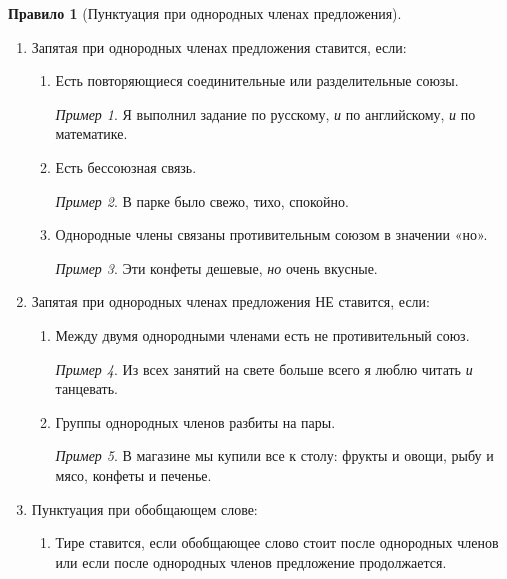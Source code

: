 \documentclass[12pt]{article}
\theoremstyle{definition}
\newtheorem{rrule}{Правило}[section]
\theoremstyle{remark}
\newtheorem*{example}{Пример}
\begin{document}
\begin{rrule}[Пунктуация при однородных членах предложения]
    \hfill 
    \begin{enumerate}
        \item Запятая при однородных членах предложения ставится, если:
        \begin{enumerate}
            \item Есть повторяющиеся соединительные или разделительные союзы.
            \begin{example}
                Я выполнил задание по русскому, \textsl{и} по английскому, \textsl{и} по математике.
            \end{example}
            \item Есть бессоюзная связь.
            \begin{example}
                В парке было свежо, тихо, спокойно. 
            \end{example}
            \item Однородные члены связаны противительным союзом в значении «но».
            \begin{example}
                Эти конфеты дешевые, \textsl{но} очень вкусные. 
            \end{example}
        \end{enumerate}
        \item Запятая при однородных членах предложения НЕ ставится, если:
        \begin{enumerate}
            \item Между двумя однородными членами есть не противительный союз.
            \begin{example}
                Из всех занятий на свете больше всего я люблю читать \textsl{и} танцевать. 
            \end{example}
            \item Группы однородных членов разбиты на пары.
            \begin{example}
                В магазине мы купили все к столу: фрукты и овощи, рыбу и мясо, конфеты и печенье. 
            \end{example}
        \end{enumerate}
        \item Пунктуация при обобщающем слове:
        \begin{enumerate}
            \item Тире ставится, если обобщающее слово стоит после однородных членов или если после однородных членов предложение продолжается.

\end{enumerate}
\end{enumerate}
\end{rrule}
\end{document}
